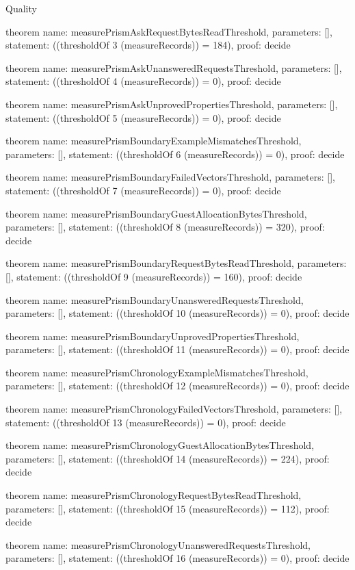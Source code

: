 \begin{lexlean}{Quality}
\begin{semanticmodule}
theorem{
  name: measurePrismAskRequestBytesReadThreshold,
  parameters: [],
  statement: ((thresholdOf 3 (measureRecords)) = 184),
  proof: decide{}
}

theorem{
  name: measurePrismAskUnansweredRequestsThreshold,
  parameters: [],
  statement: ((thresholdOf 4 (measureRecords)) = 0),
  proof: decide{}
}

theorem{
  name: measurePrismAskUnprovedPropertiesThreshold,
  parameters: [],
  statement: ((thresholdOf 5 (measureRecords)) = 0),
  proof: decide{}
}

theorem{
  name: measurePrismBoundaryExampleMismatchesThreshold,
  parameters: [],
  statement: ((thresholdOf 6 (measureRecords)) = 0),
  proof: decide{}
}

theorem{
  name: measurePrismBoundaryFailedVectorsThreshold,
  parameters: [],
  statement: ((thresholdOf 7 (measureRecords)) = 0),
  proof: decide{}
}

theorem{
  name: measurePrismBoundaryGuestAllocationBytesThreshold,
  parameters: [],
  statement: ((thresholdOf 8 (measureRecords)) = 320),
  proof: decide{}
}

theorem{
  name: measurePrismBoundaryRequestBytesReadThreshold,
  parameters: [],
  statement: ((thresholdOf 9 (measureRecords)) = 160),
  proof: decide{}
}

theorem{
  name: measurePrismBoundaryUnansweredRequestsThreshold,
  parameters: [],
  statement: ((thresholdOf 10 (measureRecords)) = 0),
  proof: decide{}
}

theorem{
  name: measurePrismBoundaryUnprovedPropertiesThreshold,
  parameters: [],
  statement: ((thresholdOf 11 (measureRecords)) = 0),
  proof: decide{}
}

theorem{
  name: measurePrismChronologyExampleMismatchesThreshold,
  parameters: [],
  statement: ((thresholdOf 12 (measureRecords)) = 0),
  proof: decide{}
}

theorem{
  name: measurePrismChronologyFailedVectorsThreshold,
  parameters: [],
  statement: ((thresholdOf 13 (measureRecords)) = 0),
  proof: decide{}
}

theorem{
  name: measurePrismChronologyGuestAllocationBytesThreshold,
  parameters: [],
  statement: ((thresholdOf 14 (measureRecords)) = 224),
  proof: decide{}
}

theorem{
  name: measurePrismChronologyRequestBytesReadThreshold,
  parameters: [],
  statement: ((thresholdOf 15 (measureRecords)) = 112),
  proof: decide{}
}

theorem{
  name: measurePrismChronologyUnansweredRequestsThreshold,
  parameters: [],
  statement: ((thresholdOf 16 (measureRecords)) = 0),
  proof: decide{}
}


\end{semanticmodule}
\end{lexlean}
